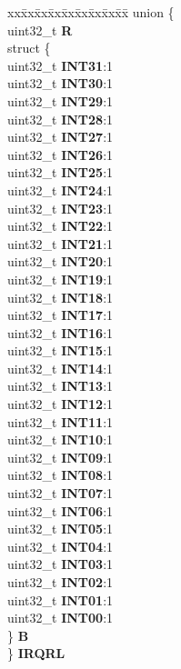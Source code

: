 \begin{DoxyCompactItemize}
\begin{tabbing}
\end{tabbing}\item 
\mbox{\label{structEDMA__tag_a2ee85050bba9c2f3d5780ae08b8a066e}} 
\begin{tabbing}
xx\=xx\=xx\=xx\=xx\=xx\=xx\=xx\=xx\=\kill
union \{\\
\>uint32\_t {\bfseries R}\\
\>struct \{\\
\>\>uint32\_t {\bfseries INT31}:1\\
\>\>uint32\_t {\bfseries INT30}:1\\
\>\>uint32\_t {\bfseries INT29}:1\\
\>\>uint32\_t {\bfseries INT28}:1\\
\>\>uint32\_t {\bfseries INT27}:1\\
\>\>uint32\_t {\bfseries INT26}:1\\
\>\>uint32\_t {\bfseries INT25}:1\\
\>\>uint32\_t {\bfseries INT24}:1\\
\>\>uint32\_t {\bfseries INT23}:1\\
\>\>uint32\_t {\bfseries INT22}:1\\
\>\>uint32\_t {\bfseries INT21}:1\\
\>\>uint32\_t {\bfseries INT20}:1\\
\>\>uint32\_t {\bfseries INT19}:1\\
\>\>uint32\_t {\bfseries INT18}:1\\
\>\>uint32\_t {\bfseries INT17}:1\\
\>\>uint32\_t {\bfseries INT16}:1\\
\>\>uint32\_t {\bfseries INT15}:1\\
\>\>uint32\_t {\bfseries INT14}:1\\
\>\>uint32\_t {\bfseries INT13}:1\\
\>\>uint32\_t {\bfseries INT12}:1\\
\>\>uint32\_t {\bfseries INT11}:1\\
\>\>uint32\_t {\bfseries INT10}:1\\
\>\>uint32\_t {\bfseries INT09}:1\\
\>\>uint32\_t {\bfseries INT08}:1\\
\>\>uint32\_t {\bfseries INT07}:1\\
\>\>uint32\_t {\bfseries INT06}:1\\
\>\>uint32\_t {\bfseries INT05}:1\\
\>\>uint32\_t {\bfseries INT04}:1\\
\>\>uint32\_t {\bfseries INT03}:1\\
\>\>uint32\_t {\bfseries INT02}:1\\
\>\>uint32\_t {\bfseries INT01}:1\\
\>\>uint32\_t {\bfseries INT00}:1\\
\>\} {\bfseries B}\\
\} {\bfseries IRQRL}\\


\end{tabbing}
\end{DoxyCompactItemize}
